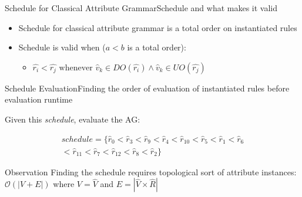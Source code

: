 \begin{frame}{Schedule for Classical Attribute Grammar}{Schedule and what makes it valid}
    \begin{itemize}
        \item Schedule for classical attribute grammar is a \alert{total order on instantiated rules}

        \item Schedule is \alert{valid} when ($a < b$ is a total order):

    \begin{itemize}
        \item $\hat{r_i} < \hat{r_j} \text{  whenever } \hat{v}_k \in \mathit{DO}(\hat{r_i}) \wedge \hat{v}_k \in \mathit{UO}(\hat{r_j})$
    \end{itemize}
    \end{itemize}

\end{frame}



\begin{frame}{Schedule Evaluation}{Finding the order of evaluation of instantiated rules before evaluation runtime}

Given this \emph{schedule}, evaluate the AG:

\begin{equation}
\begin{split}
\mathit{schedule} = \Big \{\hat{r}_0 < \hat{r}_3 < \hat{r}_9 < \hat{r}_4 < \hat{r}_{10} < \hat{r}_5 < \hat{r}_1 < \hat{r}_6 \\
< \hat{r}_{11} < \hat{r}_7 < \hat{r}_{12} < \hat{r}_8 < \hat{r}_2 \Big \}    
\end{split}
\end{equation}

\begin{alertblock}{Observation}
Finding the schedule requires topological sort of attribute instances: $\mathcal{O}(| V +  E|)$ where $V = \hat{V}$ and $E = |\hat{V}  \times  \hat{R}|$
\end{alertblock}
\end{frame}

